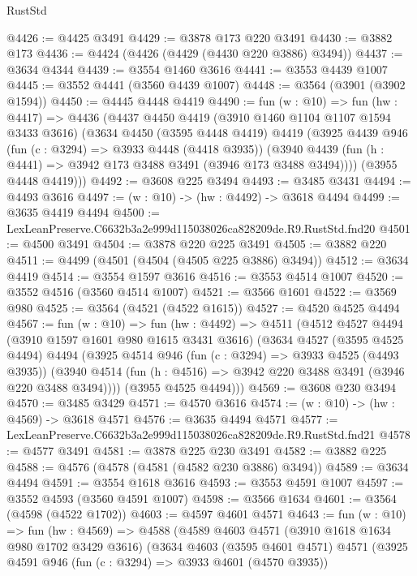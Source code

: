 \begin{lexlean}{RustStd}
\begin{coremodule}
@4426 := @4425 @3491
@4429 := @3878 @173 @220 @3491
@4430 := @3882 @173
@4436 := @4424 (@4426 (@4429 (@4430 @220 @3886) @3494))
@4437 := @3634 @4344
@4439 := @3554 @1460 @3616
@4441 := @3553 @4439 @1007
@4445 := @3552 @4441 (@3560 @4439 @1007)
@4448 := @3564 (@3901 (@3902 @1594))
@4450 := @4445 @4448 @4419
@4490 := fun (w : @10) =>
  fun (hw : @4417) =>
  @4436
    (@4437
      @4450
      @4419
      (@3910 @1460 @1104 @1107 @1594 @3433 @3616)
      (@3634
        @4450
        (@3595 @4448 @4419)
        @4419
        (@3925
          @4439
          @946
          (fun (c : @3294) => @3933 @4448 (@4418 @3935))
          (@3940 @4439 (fun (h : @4441) => @3942 @173 @3488 @3491 (@3946 @173 @3488 @3494))))
        (@3955 @4448 @4419)))
@4492 := @3608 @225 @3494
@4493 := @3485 @3431
@4494 := @4493 @3616
@4497 := (w : @10) -> (hw : @4492) -> @3618 @4494
@4499 := @3635 @4419 @4494
@4500 := LexLeanPreserve.C6632b3a2e999d115038026ca828209de.R9.RustStd.fnd20
@4501 := @4500 @3491
@4504 := @3878 @220 @225 @3491
@4505 := @3882 @220
@4511 := @4499 (@4501 (@4504 (@4505 @225 @3886) @3494))
@4512 := @3634 @4419
@4514 := @3554 @1597 @3616
@4516 := @3553 @4514 @1007
@4520 := @3552 @4516 (@3560 @4514 @1007)
@4521 := @3566 @1601
@4522 := @3569 @980
@4525 := @3564 (@4521 (@4522 @1615))
@4527 := @4520 @4525 @4494
@4567 := fun (w : @10) =>
  fun (hw : @4492) =>
  @4511
    (@4512
      @4527
      @4494
      (@3910 @1597 @1601 @980 @1615 @3431 @3616)
      (@3634
        @4527
        (@3595 @4525 @4494)
        @4494
        (@3925
          @4514
          @946
          (fun (c : @3294) => @3933 @4525 (@4493 @3935))
          (@3940 @4514 (fun (h : @4516) => @3942 @220 @3488 @3491 (@3946 @220 @3488 @3494))))
        (@3955 @4525 @4494)))
@4569 := @3608 @230 @3494
@4570 := @3485 @3429
@4571 := @4570 @3616
@4574 := (w : @10) -> (hw : @4569) -> @3618 @4571
@4576 := @3635 @4494 @4571
@4577 := LexLeanPreserve.C6632b3a2e999d115038026ca828209de.R9.RustStd.fnd21
@4578 := @4577 @3491
@4581 := @3878 @225 @230 @3491
@4582 := @3882 @225
@4588 := @4576 (@4578 (@4581 (@4582 @230 @3886) @3494))
@4589 := @3634 @4494
@4591 := @3554 @1618 @3616
@4593 := @3553 @4591 @1007
@4597 := @3552 @4593 (@3560 @4591 @1007)
@4598 := @3566 @1634
@4601 := @3564 (@4598 (@4522 @1702))
@4603 := @4597 @4601 @4571
@4643 := fun (w : @10) =>
  fun (hw : @4569) =>
  @4588
    (@4589
      @4603
      @4571
      (@3910 @1618 @1634 @980 @1702 @3429 @3616)
      (@3634
        @4603
        (@3595 @4601 @4571)
        @4571
        (@3925
          @4591
          @946
          (fun (c : @3294) => @3933 @4601 (@4570 @3935))

\end{coremodule}
\end{lexlean}
